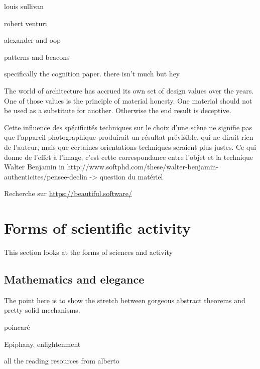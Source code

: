 
louis sullivan

robert venturi


alexander and oop

patterns and beacons


specifically the cognition paper. there isn't much but hey


The world of architecture has accrued its own set of design values over the years. One of those values is the principle of material honesty. One material should not be used as a substitute for another. Otherwise the end result is deceptive.\citep{keith_resilient_2016}

Cette influence des spécificités techniques sur le choix d'une scène ne signifie pas que l'appareil photographique produirait un résultat prévisible, qui ne dirait rien de l'auteur, mais que certaines orientations techniques seraient plus justes. Ce qui donne de l'effet à l'image, c'est cette correspondance entre l'objet et la technique Walter Benjamin in http://www.softphd.com/these/walter-benjamin-authenticites/pensee-declin -> question du matériel

Recherche sur \url{https://beautiful.software/}


\section{Forms of scientific activity}
\label{sec:aesthetic-scientific}

This section looks at the forms of sciences and activity


\subsection{Mathematics and elegance}
\label{subsec:aesthetic-mathematics}

The point here is to show the stretch between gorgeous abstract theorems and pretty solid mechanisms.

poincaré

Epiphany, enlightenment

all the reading resources from alberto


